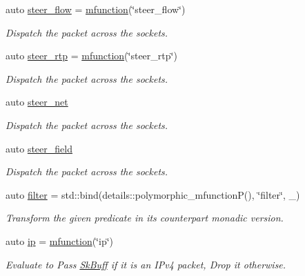 \begin{DoxyCompactItemize}
auto \hyperlink{namespacepfq_1_1lang_1_1anonymous__namespace_02default_8hpp_03_adeb44c976ac903e7b13addb65ac41f9f}{steer\+\_\+flow} = \hyperlink{namespacepfq_1_1lang_ac3ec84f09576bf5fb5db464623a4c165}{mfunction}(\char`\"{}steer\+\_\+flow\char`\"{})
\begin{DoxyCompactList}\small\item\em Dispatch the packet across the sockets. \end{DoxyCompactList}\item 
auto \hyperlink{namespacepfq_1_1lang_1_1anonymous__namespace_02default_8hpp_03_ac3bc5ec07d93fa5d9266e0e08191fe22}{steer\+\_\+rtp} = \hyperlink{namespacepfq_1_1lang_ac3ec84f09576bf5fb5db464623a4c165}{mfunction}(\char`\"{}steer\+\_\+rtp\char`\"{})
\begin{DoxyCompactList}\small\item\em Dispatch the packet across the sockets. \end{DoxyCompactList}\item 
auto \hyperlink{namespacepfq_1_1lang_1_1anonymous__namespace_02default_8hpp_03_a6f8d514e40bb2b0e874fb26d2b416dc3}{steer\+\_\+net}
\begin{DoxyCompactList}\small\item\em Dispatch the packet across the sockets. \end{DoxyCompactList}\item 
auto \hyperlink{namespacepfq_1_1lang_1_1anonymous__namespace_02default_8hpp_03_ad861e297a10876e534c5c9053ec23999}{steer\+\_\+field}
\begin{DoxyCompactList}\small\item\em Dispatch the packet across the sockets. \end{DoxyCompactList}\item 
auto \hyperlink{namespacepfq_1_1lang_1_1anonymous__namespace_02default_8hpp_03_a2cd9558bea65b0eaf337f9e09ae2bdb3}{filter} = std\+::bind(details\+::polymorphic\+\_\+mfunction\+P(), \char`\"{}filter\char`\"{}, \+\_)
\begin{DoxyCompactList}\small\item\em Transform the given predicate in its counterpart monadic version. \end{DoxyCompactList}\item 
auto \hyperlink{namespacepfq_1_1lang_1_1anonymous__namespace_02default_8hpp_03_a738d1b52bf88feb4f7b1a17b97cdc8df}{ip} = \hyperlink{namespacepfq_1_1lang_ac3ec84f09576bf5fb5db464623a4c165}{mfunction}(\char`\"{}ip\char`\"{})
\begin{DoxyCompactList}\small\item\em Evaluate to {\ttfamily Pass} \hyperlink{structpfq_1_1lang_1_1SkBuff}{Sk\+Buff} if it is an I\+Pv4 packet, {\ttfamily Drop} it otherwise. \end{DoxyCompactList}\item 

\end{DoxyCompactItemize}
